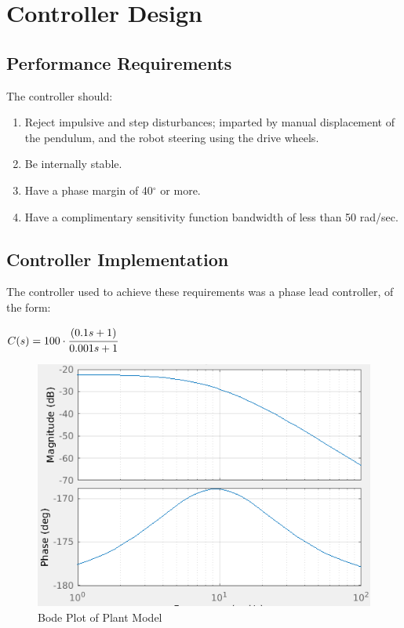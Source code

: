 \documentclass[11pt, a4paper,twocolumn]{article}
\begin{document}
\section{	Controller Design	}\label{sec:design}

	\subsection{	Performance Requirements	}
	The controller should:
	\begin{enumerate}
	\item Reject impulsive and step disturbances; imparted by manual displacement of the pendulum, and the robot steering using the drive wheels.
	\item Be internally stable.
	\item Have a phase margin of 40$^\circ$ or more.
	\item Have a complimentary sensitivity function bandwidth of less than 50 rad/sec.
	\end{enumerate}
	
	\subsection{	Controller Implementation	}

	The controller used to achieve these requirements was a phase lead controller, of the form:
	\begin{center}
		$ C(s) = 100 \cdot \cfrac{(0.1s + 1)}{0.001s + 1} $
	\end{center}
		\begin{figure}[h!]
			\centering
			\includegraphics[scale=0.4]{bode_plant}
			\caption{Bode Plot of Plant Model}
			\label{fig:bode_plnt}
		\end{figure}
\end{document}
